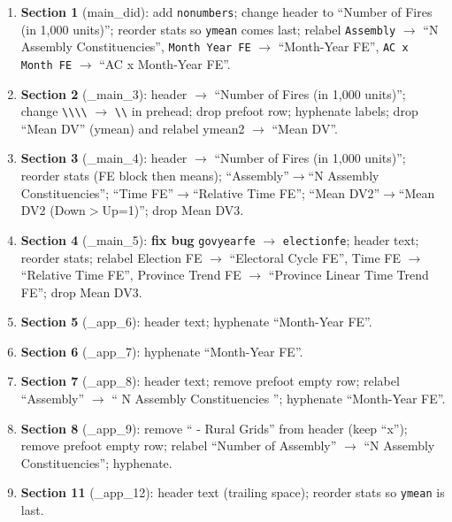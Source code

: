 \documentclass[10pt,landscape]{article}
\begin{document}
\begin{enumerate}
\item \textbf{Section 1} (main\_did): add \texttt{nonumbers}; change header to
      ``Number of Fires (in 1,000 units)''; reorder stats so \texttt{ymean}
      comes last; relabel \texttt{Assembly} $\rightarrow$ ``N Assembly Constituencies'',
      \texttt{Month Year FE} $\rightarrow$ ``Month-Year FE'',
      \texttt{AC x Month FE} $\rightarrow$ ``AC x Month-Year FE''.

\item \textbf{Section 2} (\_main\_3): header $\rightarrow$ ``Number of Fires (in 1,000 units)'';
      change \texttt{\textbackslash\textbackslash\textbackslash\textbackslash} $\rightarrow$
      \texttt{\textbackslash\textbackslash} in prehead; drop prefoot row; hyphenate labels;
      drop ``Mean DV'' (ymean) and relabel ymean2 $\rightarrow$ ``Mean DV''.

\item \textbf{Section 3} (\_main\_4): header $\rightarrow$ ``Number of Fires (in 1,000 units)'';
      reorder stats (FE block then means); ``Assembly''$\rightarrow$``N Assembly Constituencies'';
      ``Time FE''$\rightarrow$``Relative Time FE''; ``Mean DV2''$\rightarrow$``Mean DV2 (Down$>$Up=1)'';
      drop Mean DV3.

\item \textbf{Section 4} (\_main\_5): \textbf{fix bug} \texttt{govyearfe} $\rightarrow$ \texttt{electionfe};
      header text; reorder stats; relabel Election FE $\rightarrow$ ``Electoral Cycle FE'',
      Time FE $\rightarrow$ ``Relative Time FE'', Province Trend FE $\rightarrow$
      ``Province Linear Time Trend FE''; drop Mean DV3.

\item \textbf{Section 5} (\_app\_6): header text; hyphenate ``Month-Year FE''.

\item \textbf{Section 6} (\_app\_7): hyphenate ``Month-Year FE''.

\item \textbf{Section 7} (\_app\_8): header text; remove prefoot empty row;
      relabel ``Assembly'' $\rightarrow$ `` N Assembly Constituencies '';
      hyphenate ``Month-Year FE''.

\item \textbf{Section 8} (\_app\_9): remove `` - Rural Grids'' from header (keep ``x'');
      remove prefoot empty row; relabel ``Number of Assembly'' $\rightarrow$
      ``N Assembly Constituencies''; hyphenate.

\item \textbf{Section 11} (\_app\_12): header text (trailing space); reorder stats
      so \texttt{ymean} is last.
\end{enumerate}
\end{document}
